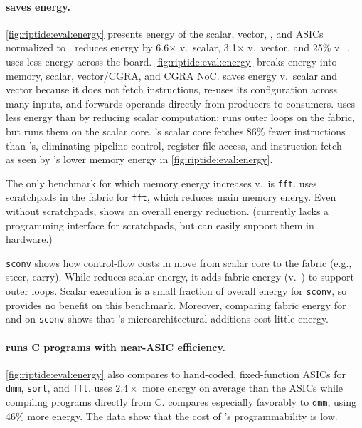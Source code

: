 \paragraph{\riptide saves energy.}
\autoref{fig:riptide:eval:energy} presents energy of the scalar, vector, 
\snafu, and ASICs normalized to \riptide.
% 
\riptide reduces energy by 6.6$\times$ v.\ scalar, 3.1$\times$ v.\ vector, and 25\% v.\ \snafu.
%
\riptide uses less energy across the board.
% 
\autoref{fig:riptide:eval:energy} breaks energy into memory, scalar, vector/CGRA, and CGRA NoC.
% 
\riptide saves energy v.\ scalar and vector because it does not fetch instructions,
re-uses its configuration across many inputs, and forwards operands 
directly from producers to consumers.
% 
\riptide uses less energy than \snafu by reducing scalar computation:  \riptide runs
outer loops on the fabric, but \snafu runs them on the scalar core.
% 
\riptide's scalar core fetches 86\% fewer instructions than \snafu's,
eliminating pipeline control,
register-file access,
and instruction fetch ---
%
as seen by \riptide's lower memory energy in \autoref{fig:riptide:eval:energy}.

The only benchmark for which memory energy increases v.\ \snafu is {\tt fft}.
% 
\snafu uses scratchpads in the fabric for {\tt fft}, which reduces main memory energy.
% 
Even without scratchpads, \riptide shows an overall energy reduction.
(\riptide currently lacks a programming interface for scratchpads,
but can easily support them in hardware.)

{\tt sconv} shows how control-flow costs in \riptide move from scalar core to the
fabric (e.g., steer, carry).
% 
While \riptide reduces scalar energy, it adds fabric energy (v.\
\snafu) to support outer loops.
% 
Scalar execution is a small fraction of overall energy for {\tt sconv},
so \riptide provides no benefit on this benchmark.
%
Moreover, comparing fabric energy for \snafu and \riptide on {\tt sconv} shows that
\riptide's microarchitectural additions cost little energy.
% 

\paragraph{\riptide runs C programs with near-ASIC efficiency.}
\autoref{fig:riptide:eval:energy} also compares \riptide to hand-coded, fixed-function
ASICs for {\tt dmm}, {\tt sort}, and {\tt fft}.
% 
\riptide uses $2.4\times$ more energy on average
than the ASICs while
compiling programs directly from C. %
% 
\riptide compares especially favorably to {\tt dmm}, using 46\% more energy.
% 
The data show that the cost of \riptide's programmability is low.

